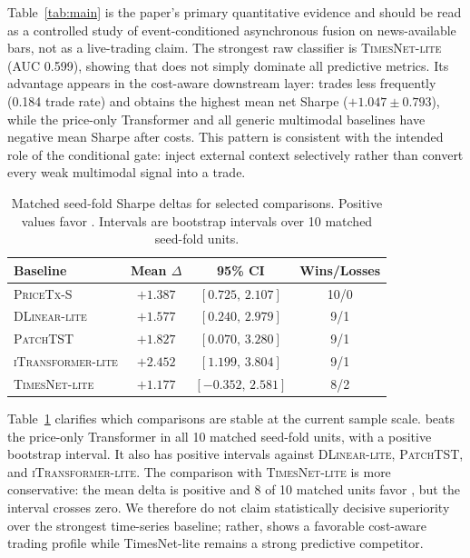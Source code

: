 Table~\ref{tab:main} is the paper's primary quantitative evidence and should be read as a controlled study of event-conditioned asynchronous fusion on news-available bars, not as a live-trading claim.
The strongest raw classifier is \textsc{TimesNet-lite} (AUC 0.599), showing that \CGCMA{} does not simply dominate all predictive metrics.
Its advantage appears in the cost-aware downstream layer: \CGCMA{} trades less frequently (0.184 trade rate) and obtains the highest mean net Sharpe ($+1.047\pm0.793$), while the price-only Transformer and all generic multimodal baselines have negative mean Sharpe after costs.
This pattern is consistent with the intended role of the conditional gate: inject external context selectively rather than convert every weak multimodal signal into a trade.

\begin{table}[tbp]
\caption{Matched seed-fold Sharpe deltas for selected comparisons. Positive values favor \CGCMA{}. Intervals are bootstrap intervals over 10 matched seed-fold units.}
\label{tab:matched}
\centering
\footnotesize
\setlength{\tabcolsep}{4pt}
\renewcommand{\arraystretch}{1.05}
\begin{tabular}{lccc}
\toprule
Baseline & Mean $\Delta$ & 95\% CI & Wins/Losses \\
\midrule
\textsc{PriceTx-S} & $+1.387$ & $[0.725,\,2.107]$ & 10/0 \\
\textsc{DLinear-lite} & $+1.577$ & $[0.240,\,2.979]$ & 9/1 \\
\textsc{PatchTST} & $+1.827$ & $[0.070,\,3.280]$ & 9/1 \\
\textsc{iTransformer-lite} & $+2.452$ & $[1.199,\,3.804]$ & 9/1 \\
\textsc{TimesNet-lite} & $+1.177$ & $[-0.352,\,2.581]$ & 8/2 \\
\bottomrule
\end{tabular}
\end{table}

Table~\ref{tab:matched} clarifies which comparisons are stable at the current sample scale.
\CGCMA{} beats the price-only Transformer in all 10 matched seed-fold units, with a positive bootstrap interval.
It also has positive intervals against \textsc{DLinear-lite}, \textsc{PatchTST}, and \textsc{iTransformer-lite}.
The comparison with \textsc{TimesNet-lite} is more conservative: the mean delta is positive and 8 of 10 matched units favor \CGCMA{}, but the interval crosses zero.
We therefore do not claim statistically decisive superiority over the strongest time-series baseline; rather, \CGCMA{} shows a favorable cost-aware trading profile while TimesNet-lite remains a strong predictive competitor.

